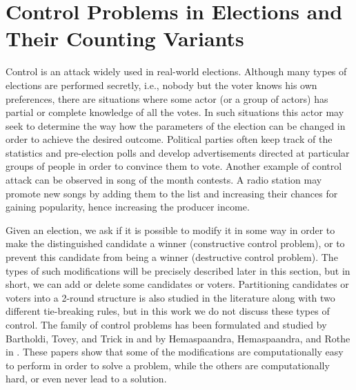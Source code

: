 % 

\section{Control Problems in Elections and Their Counting Variants} \label{sec:control}

Control is an attack widely used in real-world elections.
Although many types of elections are performed secretly, i.e., nobody but the voter knows his own preferences, there are situations where some actor (or a group of actors) has partial or complete knowledge of all the votes.
In such situations this actor may seek to determine the way how the parameters of the election can be changed in order to achieve the desired outcome.
Political parties often keep track of the statistics and pre-election polls and develop advertisements directed at particular groups of people in order to convince them to vote.
Another example of control attack can be observed in song of the month contests.
A radio station may promote new songs by adding them to the list and increasing their chances for gaining popularity, hence increasing the producer income.

Given an election, we ask if it is possible to modify it in some way in order to make the distinguished candidate a winner (constructive control problem), or to prevent this candidate from being a winner (destructive control problem).
The types of such modifications will be precisely described later in this section, but in short, we can add or delete some candidates or voters.
Partitioning candidates or voters into a 2-round structure is also studied in the literature along with two different tie-breaking rules, but in this work we do not discuss these types of control.
The family of control problems has been formulated and studied by Bartholdi, Tovey, and Trick in \cite{bartholdi} and by Hemaspaandra, Hemaspaandra, and Rothe in \cite{hemaspaandra}.
These papers show that some of the modifications are computationally easy to perform in order to solve a problem, while the others are computationally hard, or even never lead to a solution.

